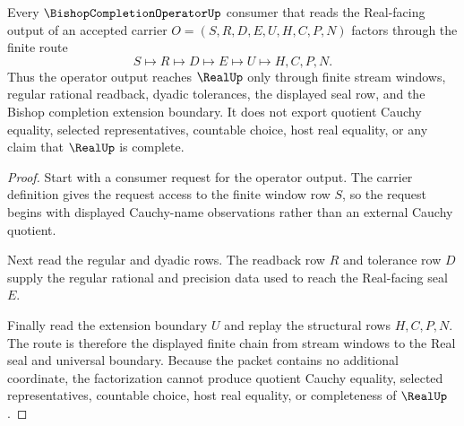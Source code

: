 \begin{theorem}
\label{thm:bishop-completion-operator-real-seal-factorization}
Every $\BishopCompletionOperatorUp$ consumer that reads the Real-facing output of an accepted carrier $O=(S,R,D,E,U,H,C,P,N)$ factors through the finite route
$$
S\longmapsto R\longmapsto D\longmapsto E\longmapsto U\longmapsto H,C,P,N .
$$
Thus the operator output reaches $\RealUp$ only through finite stream windows, regular rational readback, dyadic tolerances, the displayed seal row, and the Bishop completion extension boundary. It does not export quotient Cauchy equality, selected representatives, countable choice, host real equality, or any claim that $\RealUp$ is complete.
\end{theorem}
\begin{proof}
Start with a consumer request for the operator output. The carrier definition gives the request access to the finite window row $S$, so the request begins with displayed Cauchy-name observations rather than an external Cauchy quotient.

Next read the regular and dyadic rows. The readback row $R$ and tolerance row $D$ supply the regular rational and precision data used to reach the Real-facing seal $E$.

Finally read the extension boundary $U$ and replay the structural rows $H,C,P,N$. The route is therefore the displayed finite chain from stream windows to the Real seal and universal boundary. Because the packet contains no additional coordinate, the factorization cannot produce quotient Cauchy equality, selected representatives, countable choice, host real equality, or completeness of $\RealUp$.
\end{proof}


\begin{closurestatus}{\BishopCompletionOperatorUp}
  \theoryclosure{\seedClosure}
  \formalstatus{\unformalizedV}
\end{closurestatus}
